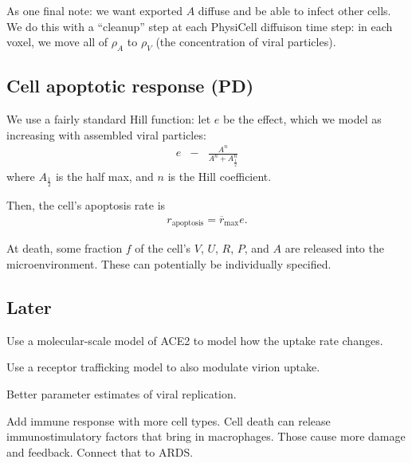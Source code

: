 \documentclass[12point]{article}
\begin{document}
As one final note: we want exported $A$ diffuse and be able to infect other cells. We do this with a ``cleanup'' step at each PhysiCell diffuison time step: in each voxel, we move all of $\rho_A$ to $\rho_V$ (the concentration 
of viral particles). 

\subsection{Cell apoptotic response (PD)}
We use a fairly standard Hill function: let $e$ be the effect, which we model as increasing with assembled viral particles: 
\begin{eqnarray}
e & - & \frac{ A^n  }{ A^n + A_{\frac{1}{2}}^n  }
\end{eqnarray}
where $A_{\frac{1}{2}}$ is the half max, and $n$ is the Hill coefficient. 

Then, the cell's apoptosis rate is 
\begin{eqnarray}
r_{\textrm{apoptosis}} = \overline{r}_\textrm{max} e. 
\end{eqnarray}

At death, some fraction $f$ of the cell's $V$, $U$, $R$, $P$, and $A$ are released into the microenvironment. These can potentially be individually specified. 

\subsection{Later}
Use a molecular-scale model of ACE2 to model how the uptake rate changes. 

Use a receptor trafficking model to also modulate virion uptake. 

Better parameter estimates of viral replication.

Add immune response with more cell types. Cell death can release immunostimulatory factors that bring in macrophages. Those cause more damage and feedback. Connect that to ARDS. 
\end{document}
